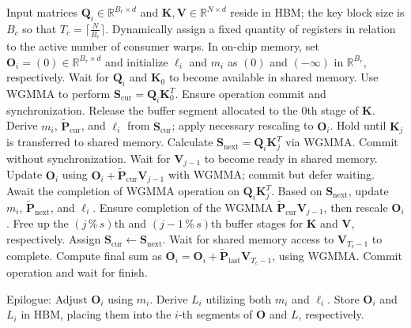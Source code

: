 \begin{algorithm}[H]
    \caption{\small\label{alg:flash3_wgmma}\textsc{FlashAttention-3} Consumer Warpgroup Forward Computation}
    \begin{algorithmic}[1]
      \REQUIRE  Input matrices $\mathbf{Q}_i \in \mathbb{R}^{B_r \times d}$ and $\mathbf{K}, \mathbf{V} \in \mathbb{R}^{N \times d}$ reside in HBM; the key block size is $B_c$ so that $T_c = \lceil \frac{N}{B_c} \rceil$.
      \STATE Dynamically assign a fixed quantity of registers in relation to the active number of consumer warps.
      \STATE In on-chip memory, set $\mathbf{O}_i = (0) \in \mathbb{R}^{B_r \times d}$ and initialize $\ell_i$ and $m_i$ as $(0)$ and $(-\infty)$ in $\mathbb{R}^{B_r}$, respectively.
      \STATE Wait for $\mathbf{Q}_i$ and $\mathbf{K}_0$ to become available in shared memory.
      \STATE Use WGMMA to perform $\mathbf{S}_{\mathrm{cur}} = \mathbf{Q}_i \mathbf{K}_0^T$. Ensure operation commit and synchronization.
      \STATE Release the buffer segment allocated to the $0$th stage of $\mathbf{K}$.
      \STATE Derive $m_i$, $\tilde{\mathbf{P}}_{\mathrm{cur}}$, and $\ell_{i}$ from $\mathbf{S}_{\mathrm{cur}}$; apply necessary rescaling to $\mathbf{O}_i$.
        \STATE Hold until $\mathbf{K}_j$ is transferred to shared memory.
        \label{code:mainloop_start}
        \STATE Calculate $\mathbf{S}_{\mathrm{next}} = \mathbf{Q}_i \mathbf{K}_{j}^T$ via WGMMA. Commit without synchronization. \label{code:first_wgmma}
        \STATE Wait for $\mathbf{V}_{j-1}$ to become ready in shared memory.
        \STATE Update $\mathbf{O}_i$ using $\mathbf{O}_{i} + \tilde{\mathbf{P}}_{\mathrm{cur}} \mathbf{V}_{j-1}$ with WGMMA; commit but defer waiting. \label{code:second_wgmma}
        \STATE Await the completion of WGMMA operation on $\mathbf{Q}_i \mathbf{K}_{j}^T$.
        \STATE Based on $\mathbf{S}_{\mathrm{next}}$, update $m_i$, $\tilde{\mathbf{P}}_{\mathrm{next}}$, and $\ell_{i}$. \label{code:softmax}
        \STATE Ensure completion of the WGMMA $\tilde{\mathbf{P}}_{\mathrm{cur}} \mathbf{V}_{j-1}$, then rescale $\mathbf{O}_i$.
        \STATE Free up the $(j\,\%\,s)$th and $(j-1\,\%\,s)$th buffer stages for $\mathbf{K}$ and $\mathbf{V}$, respectively.
        \STATE Assign $\mathbf{S}_{\mathrm{cur}} \gets \mathbf{S}_{\mathrm{next}}$.
        \label{code:mainloop_end}
      \ENDFOR \STATE Wait for shared memory access to $\mathbf{V}_{T_c - 1}$ to complete.
      \STATE Compute final sum as $\mathbf{O}_{i} = \mathbf{O}_{i} + \tilde{\mathbf{P}}_{\mathrm{last}} \mathbf{V}_{T_c - 1}$, using WGMMA. Commit operation and wait for finish.

\STATE Epilogue: Adjust $\mathbf{O}_{i}$ using $m_{i}$. Derive $L_{i}$ utilizing both $m_{i}$ and $\ell_{i}$. Store $\mathbf{O}_{i}$ and $L_{i}$ in HBM, placing them into the $i$-th segments of $\mathbf{O}$ and $L$, respectively.
\end{algorithmic}
\end{algorithm}

